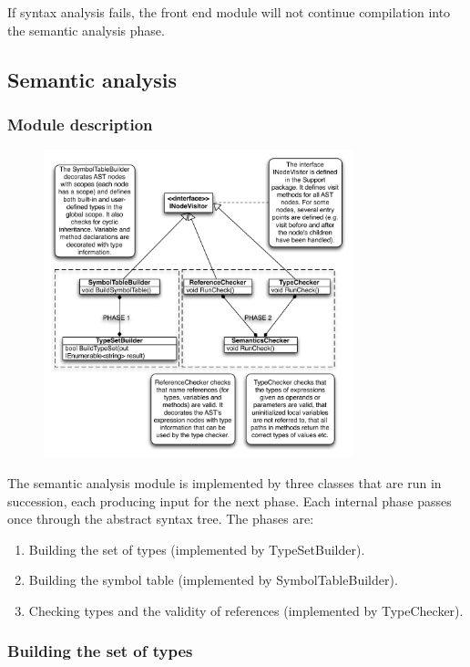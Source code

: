 \documentclass[a4paper,11pt]{article}
\begin{document}
If syntax analysis fails, the front end module will not continue compilation into the semantic analysis phase.

\subsection{Semantic analysis}

\subsubsection{Module description}

\begin{figure}[h!]
\centering
\includegraphics[width=0.8\textwidth]{semantic_analysis.pdf}
\end{figure}

The semantic analysis module is implemented by three classes that are run in succession, each producing input for the next phase. Each internal phase passes once through the abstract syntax tree. The phases are:

\begin{enumerate}
\item Building the set of types (implemented by TypeSetBuilder).
\item Building the symbol table (implemented by SymbolTableBuilder).
\item Checking types and the validity of references (implemented by TypeChecker).
\end{enumerate}

\subsubsection{Building the set of types}
\end{document}
